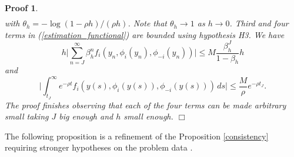 \documentclass[12pt]{article}
\newtheorem{Proof}{Proof}
\newenvironment{proof}{\begin{Proof}\rm}{\hfill $\Box$ \end{Proof}}
\begin{document}
\begin{proof}
\begin{equation*}
\begin{split}
\end{split}
\end{equation*}
with $\theta_h=-\log(1-\rho h)/(\rho h)$. Note that $\theta_h\rightarrow 1$ as $h\rightarrow 0$.
Third and four terms in (\ref{estimation_functional}) are bounded using hypothesis H3. We have
$$
h\bigl |\sum_{n=J}^\infty\beta_h^nf_i(y_n,\phi_i(y_n),\phi_{-i}(y_n))\bigr|\le
M\frac{\beta_h^J}{1-\beta_h}h
$$
and
$$\bigl |\int_{t_J}^\infty e^{-\rho t}f_i({y}(s),\phi_i({y}(s)),\phi_{-i}({y}(s)))\, ds\bigr|\le
\frac{M}{\rho}e^{-\rho t_J}.
$$
The proof finishes observing that each of the four terms can be made arbitrary small taking  $J$ big enough and $h$ small enough. \end{proof}

The following proposition is a refinement of the Proposition \ref{consistency} requiring stronger hypotheses on the problem data {\cite[Chapter 6 Lemma 1.2]{Bardi}}.
\end{document}
